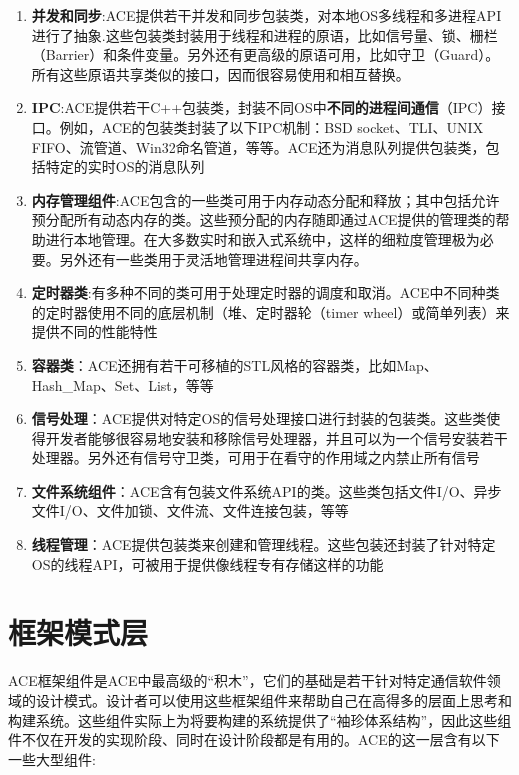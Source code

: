 \documentclass[UTF8,a4paper,12pt]{ctexbook}
\begin{document}
		\begin{enumerate}
			\item \textbf{并发和同步}:ACE提供若干并发和同步包装类，对本地OS多线程和多进程API进行了抽象.这些包装类封装用于线程和进程的原语，比如信号量、锁、栅栏（Barrier）和条件变量。另外还有更高级的原语可用，比如守卫（Guard）。所有这些原语共享类似的接口，因而很容易使用和相互替换。
			
			\item \textbf{IPC}:ACE提供若干C++包装类，封装不同OS中\textbf{不同的进程间通信}（IPC）接口。例如，ACE的包装类封装了以下IPC机制：BSD socket、TLI、UNIX FIFO、流管道、Win32命名管道，等等。ACE还为消息队列提供包装类，包括特定的实时OS的消息队列
			
			\item \textbf{内存管理组件}:ACE包含的一些类可用于内存动态分配和释放；其中包括允许预分配所有动态内存的类。这些预分配的内存随即通过ACE提供的管理类的帮助进行本地管理。在大多数实时和嵌入式系统中，这样的细粒度管理极为必要。另外还有一些类用于灵活地管理进程间共享内存。
			
			\item \textbf{定时器类}:有多种不同的类可用于处理定时器的调度和取消。ACE中不同种类的定时器使用不同的底层机制（堆、定时器轮（timer wheel）或简单列表）来提供不同的性能特性
			
			\item \textbf{容器类}：ACE还拥有若干可移植的STL风格的容器类，比如Map、Hash\_Map、Set、List，等等
			
			\item \textbf{信号处理}：ACE提供对特定OS的信号处理接口进行封装的包装类。这些类使得开发者能够很容易地安装和移除信号处理器，并且可以为一个信号安装若干处理器。另外还有信号守卫类，可用于在看守的作用域之内禁止所有信号
			
			\item \textbf{文件系统组件}：ACE含有包装文件系统API的类。这些类包括文件I/O、异步文件I/O、文件加锁、文件流、文件连接包装，等等
			
			\item \textbf{线程管理}：ACE提供包装类来创建和管理线程。这些包装还封装了针对特定OS的线程API，可被用于提供像线程专有存储这样的功能
		\end{enumerate}
	\section{框架模式层}
		ACE框架组件是ACE中最高级的“积木”，它们的基础是若干针对特定通信软件领域的设计模式。设计者可以使用这些框架组件来帮助自己在高得多的层面上思考和构建系统。这些组件实际上为将要构建的系统提供了“袖珍体系结构”，因此这些组件不仅在开发的实现阶段、同时在设计阶段都是有用的。ACE的这一层含有以下一些大型组件:
		
\end{document}
